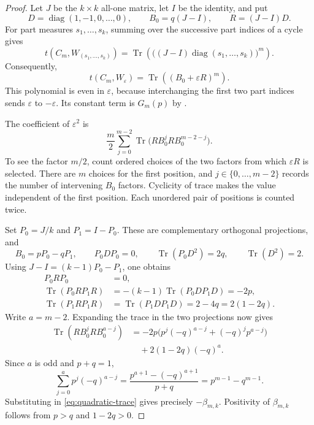 \documentclass[11pt]{article}
\theoremstyle{remark}
\newcommand{\Tr}{\operatorname{Tr}}
\begin{document}
\begin{proof}
Let $J$ be the $k\times k$ all-one matrix, let $I$ be the identity,
and put
\[
 D=\operatorname{diag}(1,-1,0,\ldots,0),\qquad
 B_0=q(J-I),\qquad R=(J-I)D.
\]
For part measures $s_1,\ldots,s_k$, summing over the successive part
indices of a cycle gives
\[
 t(C_m,W_{(s_1,\ldots,s_k)})
 =\Tr\!\left(\bigl((J-I)\operatorname{diag}(s_1,\ldots,s_k)\bigr)^m\right).
\]
Consequently,
\[
 t(C_m,W_\varepsilon)=\Tr\!\left((B_0+\varepsilon R)^m\right).
\]
This polynomial is even in $\varepsilon$, because interchanging the
first two part indices sends $\varepsilon$ to $-\varepsilon$.
Its constant term is $G_m(p)$ by \cite[Eq.~(1.1)]{dense}.

The coefficient of $\varepsilon^2$ is
\begin{equation}\label{eq:quadratic-trace}
 \frac m2\sum_{j=0}^{m-2}
 \Tr\bigl(RB_0^jRB_0^{m-2-j}\bigr).
\end{equation}
To see the factor $m/2$, count ordered choices of the two factors
from which $\varepsilon R$ is selected. There are $m$ choices for
the first position, and $j\in\{0,\ldots,m-2\}$ records the number
of intervening $B_0$ factors. Cyclicity of trace makes the value
independent of the first position. Each unordered pair of positions
is counted twice.

Set $P_0=J/k$ and $P_1=I-P_0$. These are complementary orthogonal
projections, and
\[
 B_0=pP_0-qP_1,\qquad P_0DP_0=0,
 \qquad\Tr(P_0D^2)=2q,\qquad\Tr(D^2)=2.
\]
Using $J-I=(k-1)P_0-P_1$, one obtains
\begin{align*}
 P_0RP_0&=0,\\
 \Tr(P_0RP_1R)
 &=-(k-1)\Tr(P_0DP_1D)=-2p,\\
 \Tr(P_1RP_1R)
 &=\Tr(P_1DP_1D)=2-4q=2(1-2q).
\end{align*}
Write $a=m-2$. Expanding the trace in the two projections now gives
\begin{align*}
 \Tr(RB_0^jRB_0^{a-j})
 &=-2p\bigl(p^j(-q)^{a-j}+(-q)^jp^{a-j}\bigr)\\
 &\quad+2(1-2q)(-q)^a.
\end{align*}
Since $a$ is odd and $p+q=1$,
\[
 \sum_{j=0}^a p^j(-q)^{a-j}
 =\frac{p^{a+1}-(-q)^{a+1}}{p+q}
 =p^{m-1}-q^{m-1}.
\]
Substituting in \eqref{eq:quadratic-trace} gives precisely
$-\beta_{m,k}$. Positivity of $\beta_{m,k}$ follows from
$p>q$ and $1-2q>0$.


\end{proof}
\end{document}

